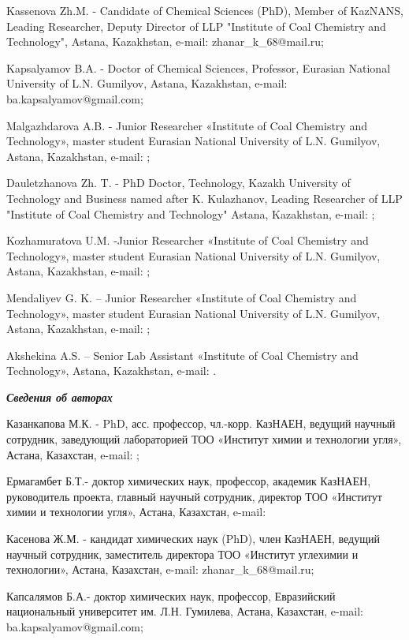 Kassenova Zh.M. - Candidate of Chemical Sciences (PhD), Member of
KazNANS, Leading Researcher, Deputy Director of LLP "Institute of Coal
Chemistry and Technology", Astana, Kazakhstan, e-mail:
zhanar\_k\_68@mail.ru;

Kapsalyamov B.A. - Doctor of Chemical Sciences, Professor, Eurasian
National University of L.N. Gumilyov, Astana, Kazakhstan, e-mail:
ba.kapsalyamov@gmail.com;

Malgazhdarova A.B. - Junior Researcher «Institute of Coal Chemistry and
Technology», master student Eurasian National University of L.N.
Gumilyov, Astana, Kazakhstan, e-mail:
\href{mailto:malgazhdarova.ab@mail.ru}{};

Dauletzhanova Zh. T. - PhD Doctor, Technology, Kazakh University of
Technology and Business named after K. Kulazhanov, Leading Researcher of
LLP "Institute of Coal Chemistry and Technology" Astana, Kazakhstan,
e-mail:
\href{mailto:kaliyeva_zhanna@mail.ru}{};

Kozhamuratova U.M. -Junior Researcher «Institute of Coal Chemistry and
Technology», master student Eurasian National University of L.N.
Gumilyov, Astana, Kazakhstan, e-mail:
\href{mailto:kozhamuratova.u@mail.ru}{};

Mendaliyev G. K. -- Junior Researcher «Institute of Coal Chemistry and
Technology», master student Eurasian National University of L.N.
Gumilyov, Astana, Kazakhstan, e-mail:
\href{mailto:ganimen02@mail.ru}{};

Akshekina A.S. -- Senior Lab Assistant «Institute of Coal Chemistry and
Technology», Astana, Kazakhstan, e-mail:
\href{mailto:akshekina11@gmail.com}{}.

\emph{{\bfseries Сведения об авторах}}

Казанкапова М.К. - PhD, асс. профессор, чл.-корр. КазНАЕН, ведущий
научный сотрудник, заведующий лабораторией ТОО «Институт химии и
технологии угля», Астана, Казахстан, e-mail:
\href{mailto:maira_1986@mail.ru}{};

Ермагамбет Б.Т.- доктор химических наук, профессор, академик КазНАЕН,
руководитель проекта, главный научный сотрудник, директор ТОО «Институт
химии и технологии угля», Астана, Казахстан, e-mail:


Касенова Ж.М. - кандидат химических наук (PhD), член КазНАЕН, ведущий
научный сотрудник, заместитель директора ТОО «Институт углехимии и
технологии», Астана, Казахстан, e-mail: zhanar\_k\_68@mail.ru;

Капсалямов Б.А.- доктор химических наук, профессор, Евразийский
национальный университет им. Л.Н. Гумилева, Астана, Казахстан, e-mail:
ba.kapsalyamov@gmail.com;

